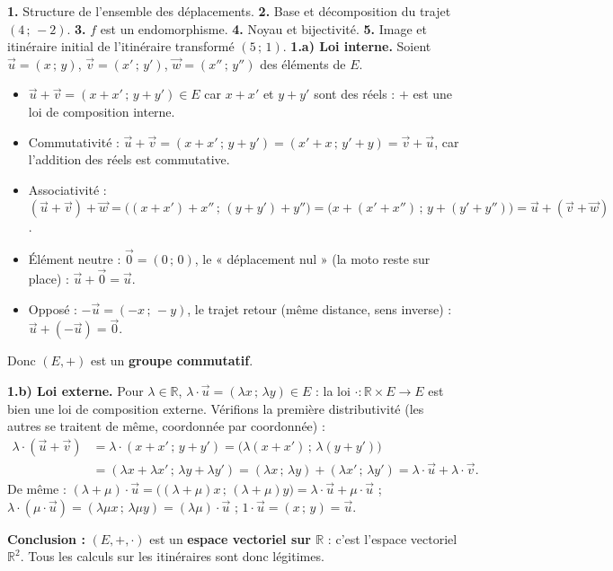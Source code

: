 \documentclass[11pt]{article}
\newcommand{\cle}[1]{{\popxbold\color{popdark}#1}}
\begin{document}
\begin{exoresolu}
\textbf{1.} Structure de l'ensemble des déplacements. \textbf{2.} Base et décomposition du trajet $(4\,;\,-2)$. \textbf{3.} $f$ est un endomorphisme. \textbf{4.} Noyau et bijectivité. \textbf{5.} Image et itinéraire initial de l'itinéraire transformé $(5\,;\,1)$.
\tcblower
\textbf{1.a) Loi interne.} Soient $\vec{u}=(x\,;\,y)$, $\vec{v}=(x'\,;\,y')$, $\vec{w}=(x''\,;\,y'')$ des éléments de $E$.
\begin{itemize}
\item $\vec{u}+\vec{v}=(x+x'\,;\,y+y')\in E$ car $x+x'$ et $y+y'$ sont des réels : $+$ est une loi de composition \cle{interne}.
\item Commutativité : $\vec{u}+\vec{v}=(x+x'\,;\,y+y')=(x'+x\,;\,y'+y)=\vec{v}+\vec{u}$, car l'addition des réels est commutative.
\item Associativité : $(\vec{u}+\vec{v})+\vec{w}=\big((x+x')+x''\,;\,(y+y')+y''\big)=\big(x+(x'+x'')\,;\,y+(y'+y'')\big)=\vec{u}+(\vec{v}+\vec{w})$.
\item Élément neutre : $\vec{0}=(0\,;\,0)$, le « déplacement nul » (la moto reste sur place) : $\vec{u}+\vec{0}=\vec{u}$.
\item Opposé : $-\vec{u}=(-x\,;\,-y)$, le trajet retour (même distance, sens inverse) : $\vec{u}+(-\vec{u})=\vec{0}$.
\end{itemize}
Donc $(E,+)$ est un \textbf{groupe commutatif}.

\textbf{1.b) Loi externe.} Pour $\lambda\in\mathbb{R}$, $\lambda\cdot\vec{u}=(\lambda x\,;\,\lambda y)\in E$ : la loi $\cdot:\mathbb{R}\times E\to E$ est bien une loi de composition \cle{externe}. Vérifions la première distributivité (les autres se traitent de même, coordonnée par coordonnée) :
\begin{align*}
\lambda\cdot(\vec{u}+\vec{v})&=\lambda\cdot(x+x'\,;\,y+y')=\big(\lambda(x+x')\,;\,\lambda(y+y')\big)\\
&=(\lambda x+\lambda x'\,;\,\lambda y+\lambda y')=(\lambda x\,;\,\lambda y)+(\lambda x'\,;\,\lambda y')=\lambda\cdot\vec{u}+\lambda\cdot\vec{v}.
\end{align*}
De même : $(\lambda+\mu)\cdot\vec{u}=\big((\lambda+\mu)x\,;\,(\lambda+\mu)y\big)=\lambda\cdot\vec{u}+\mu\cdot\vec{u}$ ; $\lambda\cdot(\mu\cdot\vec{u})=(\lambda\mu x\,;\,\lambda\mu y)=(\lambda\mu)\cdot\vec{u}$ ; $1\cdot\vec{u}=(x\,;\,y)=\vec{u}$.

\textbf{Conclusion :} $(E,+,\cdot)$ est un \textbf{espace vectoriel sur $\mathbb{R}$} : c'est l'espace vectoriel $\mathbb{R}^2$. Tous les calculs sur les itinéraires sont donc légitimes.


\end{exoresolu}
\end{document}
